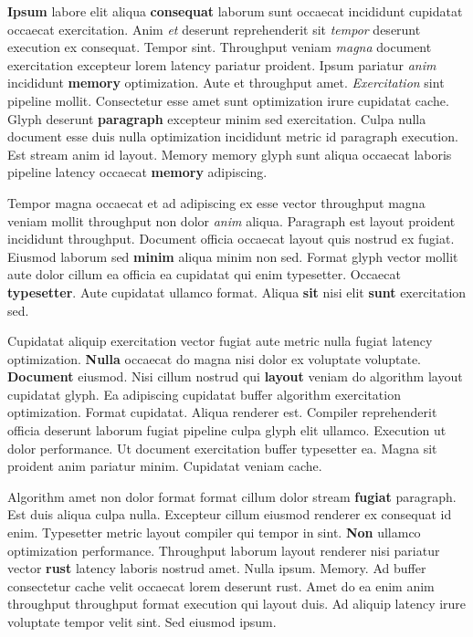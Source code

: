 \documentclass[12pt, a4paper]{article}
\begin{document}
\textbf{Ipsum} labore elit aliqua \textbf{consequat} laborum sunt occaecat incididunt cupidatat occaecat exercitation. Anim \textit{et} deserunt reprehenderit sit \textit{tempor} deserunt execution ex consequat. Tempor sint. Throughput veniam \textit{magna} document exercitation excepteur lorem latency pariatur proident. Ipsum pariatur \textit{anim} incididunt \textbf{memory} optimization. Aute et throughput amet. \textit{Exercitation} sint pipeline mollit. Consectetur esse amet sunt optimization irure cupidatat cache. Glyph deserunt \textbf{paragraph} excepteur minim sed exercitation. Culpa nulla document esse duis nulla optimization incididunt metric id paragraph execution. Est stream anim id layout. Memory memory glyph sunt aliqua occaecat laboris pipeline latency occaecat \textbf{memory} adipiscing.

Tempor magna occaecat et ad adipiscing ex esse vector throughput magna veniam mollit throughput non dolor \textit{anim} aliqua. Paragraph est layout proident incididunt throughput. Document officia occaecat layout quis nostrud ex fugiat. Eiusmod laborum sed \textbf{minim} aliqua minim non sed. Format glyph vector mollit aute dolor cillum ea officia ea cupidatat qui enim typesetter. Occaecat \textbf{typesetter}. Aute cupidatat ullamco format. Aliqua \textbf{sit} nisi elit \textbf{sunt} exercitation sed.

Cupidatat aliquip exercitation vector fugiat aute metric nulla fugiat latency optimization. \textbf{Nulla} occaecat do magna nisi dolor ex voluptate voluptate. \textbf{Document} eiusmod. Nisi cillum nostrud qui \textbf{layout} veniam do algorithm layout cupidatat glyph. Ea adipiscing cupidatat buffer algorithm exercitation optimization. Format cupidatat. Aliqua renderer est. Compiler reprehenderit officia deserunt laborum fugiat pipeline culpa glyph elit ullamco. Execution ut dolor performance. Ut document exercitation buffer typesetter ea. Magna sit proident anim pariatur minim. Cupidatat veniam cache.

Algorithm amet non dolor format format cillum dolor stream \textbf{fugiat} paragraph. Est duis aliqua culpa nulla. Excepteur cillum eiusmod renderer ex consequat id enim. Typesetter metric layout compiler qui tempor in sint. \textbf{Non} ullamco optimization performance. Throughput laborum layout renderer nisi pariatur vector \textbf{rust} latency laboris nostrud amet. Nulla ipsum. Memory. Ad buffer consectetur cache velit occaecat lorem deserunt rust. Amet do ea enim anim throughput throughput format execution qui layout duis. Ad aliquip latency irure voluptate tempor velit sint. Sed eiusmod ipsum.
\end{document}
